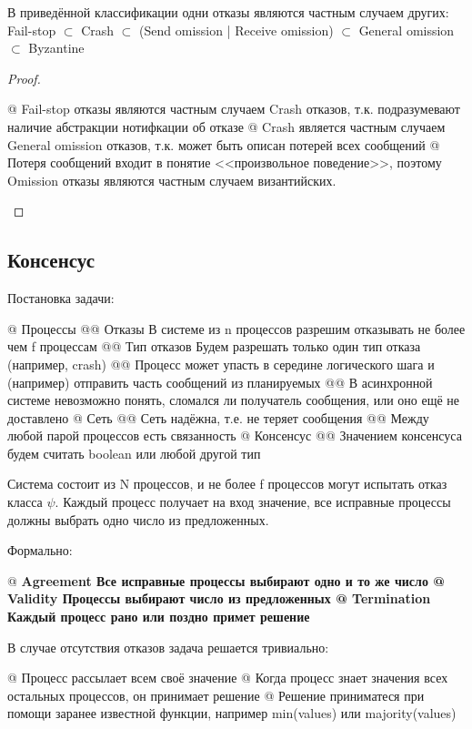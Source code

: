 \begin{stmt}
В приведённой классификации одни отказы являются частным случаем других:
Fail-stop $\subset$ Crash $\subset$ (Send omission | Receive omission) $\subset$ General omission $\subset$ Byzantine
\end{stmt}
\begin{proof}
\begin{el}[ul]
@ Fail-stop отказы являются частным случаем Crash отказов, т.к. подразумевают наличие абстракции нотифкации об отказе
@ Crash является частным случаем General omission отказов, т.к. может быть описан потерей всех сообщений
@ Потеря сообщений входит в понятие <<произвольное поведение>>, поэтому Omission отказы являются частным случаем византийских.
\end{el}
\end{proof}

\subsection{Консенсус}
Постановка задачи:

\begin{el}[ul]
@ Процессы
@@ Отказы 
 В системе из n процессов разрешим отказывать не более чем f процессам
@@ Тип отказов Будем разрешать только один тип отказа (например, crash)
@@ Процесс может упасть в середине логического шага и (например) отправить часть сообщений из планируемых
@@ В асинхронной системе невозможно понять, сломался ли получатель сообщения, или оно ещё не доставлено
@ Сеть
@@ Сеть надёжна, т.е. не теряет сообщения
@@ Между любой парой процессов есть связанность
@ Консенсус
@@ Значением консенсуса будем считать boolean или любой другой тип
\end{el}

Система состоит из N процессов, и не более f процессов могут испытать отказ класса $\psi$. Каждый процесс получает на вход значение, все исправные процессы должны выбрать одно число из предложенных.

Формально:
\begin{el}[ul]
@ \bf{Agreement} Все исправные процессы выбирают одно и то же число
@ \bf{Validity} Процессы выбирают число из предложенных
@ \bf{Termination} Каждый процесс рано или поздно примет решение
\end{el}

В случае отсутствия отказов задача решается тривиально:
\begin{el}[ul]
@ Процесс рассылает всем своё значение
@ Когда процесс знает значения всех остальных процессов, он принимает решение
@ Решение приниматеся при помощи заранее известной функции, например min(values) или majority(values)
\end{el}


